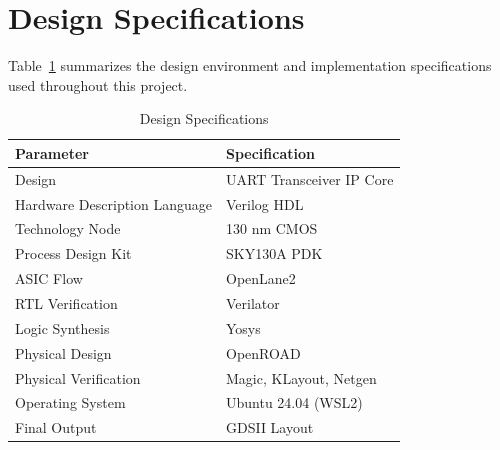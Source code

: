 
\section{Design Specifications}

Table~\ref{tab:design_specifications} summarizes the design environment and implementation specifications used throughout this project.

\begin{table}[!htbp]
\centering
\caption{Design Specifications}
\label{tab:design_specifications}

\renewcommand{\arraystretch}{1.3}

\begin{tabular}{|p{6cm}|p{7cm}|}
\hline

\textbf{Parameter} & \textbf{Specification} \\

\hline

Design & UART Transceiver IP Core \\

\hline

Hardware Description Language & Verilog HDL \\

\hline

Technology Node & 130 nm CMOS \\

\hline

Process Design Kit & SKY130A PDK \\

\hline

ASIC Flow & OpenLane2 \\

\hline

RTL Verification & Verilator \\

\hline

Logic Synthesis & Yosys \\

\hline

Physical Design & OpenROAD \\

\hline

Physical Verification & Magic, KLayout, Netgen \\

\hline

Operating System & Ubuntu 24.04 (WSL2) \\

\hline

Final Output & GDSII Layout \\

\hline

\end{tabular}

\end{table}

